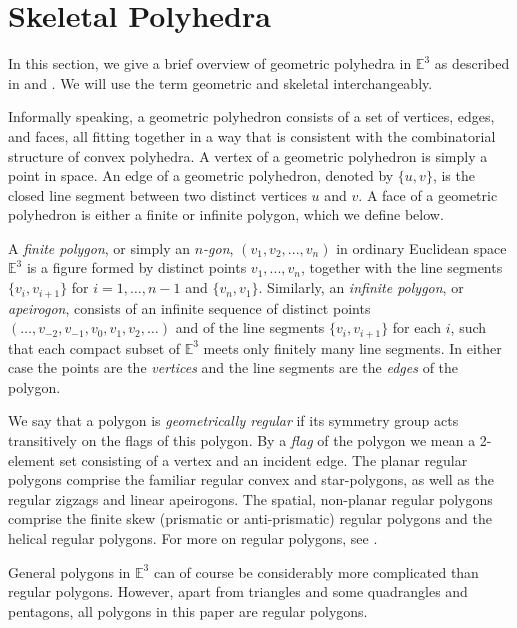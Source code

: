 \documentclass[12pt]{article}
\theoremstyle{definition}\newtheorem{definition}{Definition}[section]
\begin{document}
\section{Skeletal Polyhedra}
\label{skelpo}

In this section, we give a brief overview of geometric polyhedra in $\mathbb{E}^3$ as described in \cite{22} and \cite[Ch.~7]{41}. We will use the term geometric and skeletal interchangeably. \smallskip

Informally speaking, a geometric polyhedron consists of a set of vertices, edges, and faces, all fitting together in a way that is consistent with the combinatorial structure of convex polyhedra. A vertex of a geometric polyhedron is simply a point in space. An edge of a geometric polyhedron, denoted by $\{u,v\}$, is the closed line segment between two distinct vertices $u$ and $v$. A face of a geometric polyhedron is either a finite or infinite polygon, which we define below. \smallskip

A \textit{finite polygon}, or simply an \textit{$n$-gon}, $(v_1,v_2,...,v_n)$ in ordinary Euclidean space $\mathbb{E}^3$ is a figure formed by distinct points $v_1,...,v_n$, together with the line segments $\{v_i,v_{i+1}\}$ for $i=1,\dots,n-1$ and $\{v_n,v_1\}$. Similarly, an \textit{infinite polygon}, or \textit{apeirogon}, consists of an infinite sequence of distinct points $(\dots,v_{-2},v_{-1},v_0,v_1,v_2,\dots)$ and of the line segments $\{v_i,v_{i+1}\}$ for each $i$, such that each compact subset of $\mathbb{E}^3$ meets only finitely many line segments. In either case the points are the \textit{vertices} and the line segments are the \textit{edges} of the polygon. \smallskip

We say that a polygon is \textit{geometrically regular} if its symmetry group acts transitively on the flags of this polygon. By a \textit{flag} of the polygon we mean a 2-element set consisting of a vertex and an incident edge. The planar regular polygons comprise the familiar regular convex and star-polygons, as well as the regular zigzags and linear apeirogons. The spatial, non-planar  regular polygons comprise the finite skew (prismatic or anti-prismatic) regular polygons and the helical regular polygons. For more on regular polygons, see \cite{7,22}.  \smallskip

General polygons in $\mathbb{E}^3$ can of course be considerably more complicated than regular polygons. However, apart from triangles and some quadrangles and pentagons, all polygons in this paper are regular polygons.\smallskip 
\end{document}
